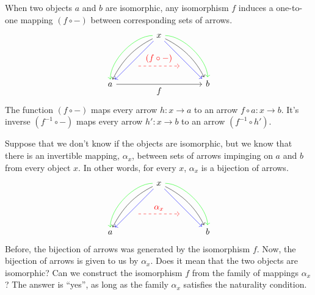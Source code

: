 \documentclass[DaoFP]{subfiles}
\begin{document}
\medskip

When two objects $a$ and $b$ are isomorphic, any isomorphism $f$ induces a one-to-one mapping $(f \circ -)$ between corresponding sets of arrows.  
\[
 \begin{tikzcd}
 \node(x) at (0, 2) {x};
 \node(a) at (-2, 0) {a};
 \node(b) at (2, 0) {b};
 \node(c1) at (-1, 1.5) {};
 \node(c2) at (-1.5, 1) {};
 \node(c3) at (-1, 2) {};
 \node(c4) at (-2, 1) {};
 \node(d1) at (1, 1.5) {};
 \node(d2) at (1.5, 1) {};
 \node(d3) at (1, 2) {};
 \node(d4) at (2, 1) {};
\node (aa) at (-1, 0.75) {};
 \node (bb) at (1, 0.75) {};
 \draw[->] (x) .. controls (c1)  and (c2) .. (a); %
 \draw[->, green] (x) .. controls (c3)  and (c4) .. (a); %
 \draw[->, blue] (x) -- (a); 
  \draw[->] (x) .. controls (d1)  and (d2) .. (b); %
 \draw[->, green] (x) .. controls (d3)  and (d4) .. (b); %
 \draw[->, blue] (x) -- (b); 
 \draw[->, red, dashed] (aa) -- node[above]{(f \circ -)} (bb);
\draw[->] (a) -- node[below]{f} (b);
 \end{tikzcd}
\]
The function $(f \circ -)$ maps every arrow $h \colon x \to a$ to an arrow $f \circ a \colon x \to b$. It's inverse $(f^{-1} \circ -)$ maps every arrow $h' \colon x \to b$ to an arrow $(f^{-1} \circ h')$.


Suppose that we don't know if the objects are isomorphic, but we know that there is an invertible mapping, $\alpha_x$, between sets of arrows impinging on $a$ and $b$ from every object $x$. In other words, for every $x$, $\alpha_x$ is a bijection of arrows. 
\[
 \begin{tikzcd}
 \node(x) at (0, 2) {x};
 \node(a) at (-2, 0) {a};
 \node(b) at (2, 0) {b};
 \node(c1) at (-1, 1.5) {};
 \node(c2) at (-1.5, 1) {};
 \node(c3) at (-1, 2) {};
 \node(c4) at (-2, 1) {};
 \node(d1) at (1, 1.5) {};
 \node(d2) at (1.5, 1) {};
 \node(d3) at (1, 2) {};
 \node(d4) at (2, 1) {};
\node (aa) at (-1, 0.75) {};
 \node (bb) at (1, 0.75) {};
 \draw[->] (x) .. controls (c1)  and (c2) .. (a); %
 \draw[->, green] (x) .. controls (c3)  and (c4) .. (a); %
 \draw[->, blue] (x) -- (a); 
  \draw[->] (x) .. controls (d1)  and (d2) .. (b); %
 \draw[->, green] (x) .. controls (d3)  and (d4) .. (b); %
 \draw[->, blue] (x) -- (b); 
 \draw[->, red, dashed] (aa) -- node[above]{\alpha_x} (bb);
 \end{tikzcd}
\]
Before, the bijection of arrows was generated by the isomorphism $f$. Now, the bijection of arrows is given to us by $\alpha_x$. Does it mean that the two objects are isomorphic? Can we construct the isomorphism $f$ from the family of mappings $\alpha_x$? The answer is ``yes'', as long as the family $\alpha_x$ satisfies the naturality condition.
\end{document}
